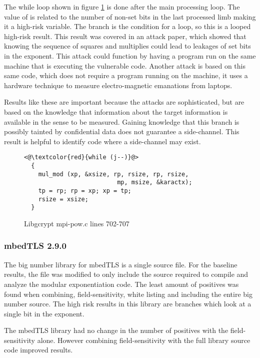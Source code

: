 The while loop shown in figure \ref{code:libgcrypt_whilej} is done after the
main processing loop. The value of  is related to the number of
non-set bits in the last processed limb making it a high-risk variable. The
branch is the condition for a loop, so this is a looped high-risk result. This
result was covered in an attack paper, which showed that knowing the sequence of
squares and multiplies could lead to leakages of set bits in the exponent. This
attack could function by having a program run on the same machine that is
executing the vulnerable code\cite{bernstein2017sliding}. Another attack is based on this same code, which
does not require a program running on the machine, it uses a hardware technique
to measure electro-magnetic emanations from laptops\cite{genkin2015stealing}.

Results like these are important because the attacks are sophisticated, but are
based on the knowledge that information about the target information is
available in the sense to be measured. Gaining knowledge that this branch is
possibly tainted by confidential data does not guarantee a side-channel. This
result is helpful to identify code where a side-channel may exist.

\begin{figure}[htpb]
\begin{lstlisting}
<@\textcolor{red}{while (j--)}@>
  {
    mul_mod (xp, &xsize, rp, rsize, rp, rsize,
                          mp, msize, &karactx);
    tp = rp; rp = xp; xp = tp;
    rsize = xsize;
  }
\end{lstlisting}
\caption{Libgcrypt mpi-pow.c lines 702-707}
\label{code:libgcrypt_whilej}
\end{figure}


\subsubsection{mbedTLS 2.9.0}

     The big number library for mbedTLS is a single source file. For the
     baseline results, the file was modified to only include the source required
     to compile and analyze the modular exponentiation code. The least amount of
     positives was found when combining, field-sensitivity, white listing and
     including the entire big number source. The high risk results in this
     library are branches which look at a single bit in the exponent.

The mbedTLS library had no change in the number of positives with the
field-sensitivity alone. However combining field-sensitivity with the full
library source code improved results.

